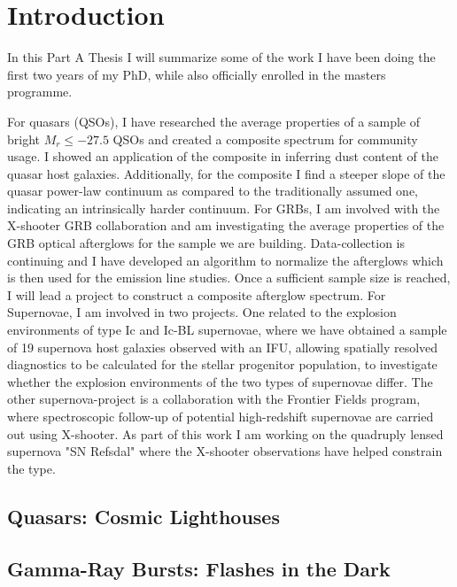 %
\chapter{Introduction}
\label{sec:intro}


In this Part A Thesis I will summarize some of the work I have been doing the first two years of my PhD, while also officially enrolled in the masters programme. 


For quasars (QSOs), I have researched the average properties of a sample of bright $M_{r} \leq -27.5$ QSOs and created a composite spectrum for community usage. I showed an application of the composite in inferring dust content of the quasar host galaxies. Additionally, for the composite I find a steeper slope of the quasar power-law continuum as compared to the traditionally assumed one, indicating an intrinsically harder continuum. 
For GRBs, I am involved with the X-shooter GRB collaboration and am investigating the average properties of the GRB optical afterglows for the sample we are building. Data-collection is continuing and I have developed an algorithm to normalize the afterglows which is then used for the emission line studies. Once a sufficient sample size is reached, I will lead a project to construct a composite afterglow spectrum. 
For Supernovae, I am involved in two projects. One related to the explosion environments of type Ic and Ic-BL supernovae, where we have obtained a sample of 19 supernova host galaxies observed with an IFU, allowing spatially resolved diagnostics to be calculated for the stellar progenitor population, to investigate whether the explosion environments of the two types of supernovae differ. The other supernova-project is a collaboration with the Frontier Fields program, where spectroscopic follow-up of potential high-redshift supernovae are carried out using X-shooter. As part of this work I am working on the quadruply lensed supernova "SN Refsdal" where the X-shooter observations have helped constrain the type.


\section{Quasars: Cosmic Lighthouses}
\label{sec:intro:qso}



\section{Gamma-Ray Bursts: Flashes in the Dark}
\label{sec:intro:vimos}


